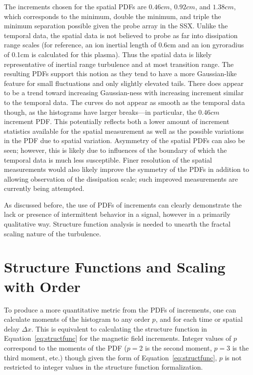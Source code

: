 \documentclass[preprint2]{aastex}
\begin{document}
The increments chosen for the spatial PDFs are $0.46cm$, $0.92cm$, and $1.38cm$, which corresponds to the minimum, double the minimum, and triple the minimum separation possible given the probe array in the SSX. Unlike the temporal data, the spatial data is not believed to probe as far into dissipation range scales (for reference, an ion inertial length of 0.6cm  and an ion gyroradius of 0.1cm is calculated for this plasma). Thus the spatial data is likely representative of inertial range turbulence and at most transition range. The resulting PDFs support this notion as they tend to have a more Gaussian-like feature for small fluctuations and only slightly elevated tails. There does appear to be a trend toward increasing Gaussian-ness with increasing increment similar to the temporal data. The curves do not appear as smooth as the temporal data though, as the histograms have larger breaks---in particular, the $0.46cm$ increment PDF. This potentially reflects both a lower amount of increment statistics available for the spatial measurement as well as the possible variations in the PDF due to spatial variation. Asymmetry of the spatial PDFs can also be seen; however, this is likely due to influences of the boundary of which the temporal data is much less susceptible. Finer resolution of the spatial measurements would also likely improve the symmetry of the PDFs in addition to allowing observation of the dissipation scale; such improved measurements are currently being attempted.

As discussed before, the use of PDFs of increments can clearly demonstrate the lack or presence of intermittent behavior in a signal, however in a primarily qualitative way. Structure function analysis is needed to unearth the fractal scaling nature of the turbulence.

\section{Structure Functions and Scaling with Order}\label{sec:structs}

To produce a more quantitative metric from the PDFs of increments, one can calculate moments of the histogram to any order $p$, and for each time or spatial delay $\Delta x$. This is equivalent to calculating the structure function in Equation~\ref{eq:structfunc} for the magnetic field increments. Integer values of $p$ correspond to the moments of the PDF ($p=2$ is the second moment, $p=3$ is the third moment, etc.) though given the form of Equation~\ref{eq:structfunc}, $p$ is not restricted to integer values in the structure function formalization.
\end{document}
